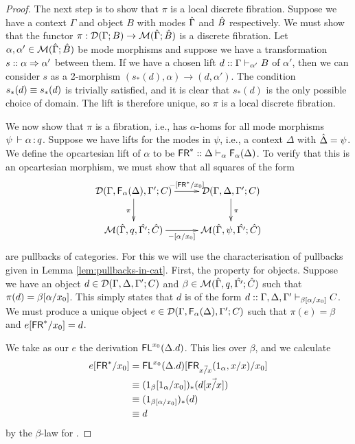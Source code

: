 \begin{proof}
The next step is to show that $\pi$ is a local discrete fibration. Suppose we have a context $\Gamma$ and object $B$ with modes $\hat{\Gamma}$ and $\hat{B}$ respectively. We must show that the functor $\pi : \mathcal{D}(\Gamma; B) \to \mathcal{M}(\hat{\Gamma}; \hat{B})$ is a discrete fibration. Let $\alpha, \alpha' \in \mathcal{M}(\hat{\Gamma}; \hat{B})$ be mode morphisms and suppose we have a transformation $s :: \alpha \Rightarrow \alpha'$ between them. If we have a chosen lift $d :: \Gamma \vdash_{\alpha'} B$ of $\alpha'$, then we can consider $s$ as a 2-morphism $(s_*(d), \alpha) \to (d, \alpha')$. The condition $s_*(d) \equiv s_*(d)$ is trivially satisfied, and it is clear that $s_*(d)$ is the only possible choice of domain. The lift is therefore unique, so $\pi$ is a local discrete fibration.

We now show that $\pi$ is a fibration, i.e., has $\alpha$-homs for all mode morphisms $\psi \, \vdash \alpha \, \mathit{:} \, q$. Suppose we have lifts for the modes in $\psi$, i.e., a context $\Delta$ with $\hat{\Delta} = \psi$. We define the opcartesian lift of $\alpha$ to be $\mathsf{FR}^* :: \Delta \vdash_{\alpha} \mathsf{F}_{\alpha}(\Delta)$. To verify that this is an opcartesian morphism, we must show that all squares of the form
\[ \xymatrix{
    \cD(\Gamma,\F{\alpha}{\Delta},\Gamma';C) \ar[r]^-{\Cut{-}{\FR^*}{x_0}} \ar[d]_\pi &
    \cD(\Gamma,\Delta,\Gamma';C) \ar[d]^\pi \\
    \M(\modeof{\Gamma}, q, \modeof{\Gamma'}; \modeof{C}) \ar[r]_-{\Cut{-}{\alpha}{x_0}} &
    \M(\modeof{\Gamma},\psi,\modeof{\Gamma'}; \modeof{C})
}\]
are pullbacks of categories. For this we will use the characterisation of pullbacks given in Lemma \ref{lem:pullbacks-in-cat}. First, the property for objects. Suppose we have an object $d \in \mathcal{D}(\Gamma,\Delta,\Gamma';C)$ and $\beta \in \mathcal{M}(\hat{\Gamma}, q, \hat{\Gamma'}; \hat{C})$ such that $\pi(d) = \beta[\alpha/x_0]$. This simply states that $d$ is of the form $d :: \Gamma, \Delta, \Gamma' \vdash_{\beta[\alpha/x_0]} C$. We must produce a unique object $e \in \mathcal{D}(\Gamma,\mathsf{F}_{\alpha}(\Delta),\Gamma';C)$ such that $\pi(e) = \beta$ and $e[\mathsf{FR}^*/x_0] = d$.

We take as our $e$ the derivation $\mathsf{FL}^{x_0}(\Delta.d)$. This lies over $\beta$, and we calculate
\begin{align*}
e[\mathsf{FR}^*/x_0] &= \mathsf{FL}^{x_0}(\Delta.d)[\mathsf{FR}_{\vec{x/x}}(1_\alpha,{x}/x)/x_0] \\
&\equiv (1_\beta[1_\alpha/x_0])_*(d[\vec{{x}/x}])\\
&\equiv (1_{\beta[\alpha/x_0]})_*(d)\\
&\equiv d
\end{align*}
by the $\beta$-law for . 


\end{proof}
